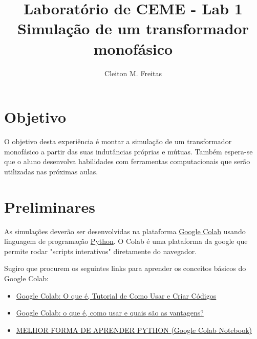 \documentclass[a4paper]{article}
\title{Laboratório de CEME - Lab 1\\Simulação de um transformador monofásico}
\author{Cleiton M. Freitas\\
}
\date{}
\theoremstyle{definition}
\theoremstyle{plain}
\begin{document}
\maketitle


\section{Objetivo}

O objetivo desta experiência é montar a simulação de um transformador monofásico a partir das suas indutâncias próprias e mútuas. Também espera-se que o aluno desenvolva habilidades com ferramentas computacionais que serão utilizadas nas próximas aulas.  




\section{Preliminares}


As simulações deverão ser desenvolvidas na plataforma \href{https://colab.research.google.com/}{Google Colab} usando linguagem de programação \href{https://www.python.org/}{Python}. O Colab é uma plataforma da google que permite rodar "scripts interativos" diretamente do navegador. 


Sugiro que procurem os seguintes links para aprender os conceitos básicos do Google Colab:

\begin{itemize}
\item \href{https://www.alura.com.br/artigos/google-colab-o-que-e-e-como-usar}{Google Colab: O que é, Tutorial de Como Usar e Criar Códigos}

\item \href{https://kenzie.com.br/blog/google-colab/}{Google Colab: o que é, como usar e quais são as vantagens?}

\item \href{https://www.youtube.com/watch?v=Gojqw9BQ5qY}{MELHOR FORMA DE APRENDER PYTHON (Google Colab Notebook)}
\end{itemize}
\end{document}
